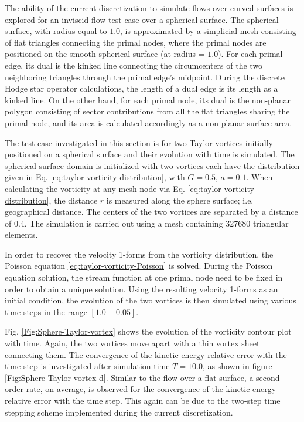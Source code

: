 \documentclass[final,12pt,times]{elsarticle}
\begin{document}
The ability of the current discretization to simulate flows over curved surfaces is explored for an inviscid flow test case over a spherical surface. The spherical surface, with radius equal to $1.0$, is approximated by a simplicial mesh consisting of flat triangles connecting the primal nodes, where the primal nodes are positioned on the smooth spherical surface (at radius = $1.0$). For each primal edge, its dual is the kinked line connecting the circumcenters of the two neighboring triangles through the primal edge's midpoint. During the discrete Hodge star operator calculations, the length of a dual edge is its length as a kinked line. On the other hand, for each primal node, its dual is the non-planar polygon consisting of sector contributions from all the flat triangles sharing the primal node, and its area is calculated accordingly as a non-planar surface area.

The test case investigated in this section is for two Taylor vortices initially positioned on a spherical surface and their evolution with time is simulated. The spherical surface domain is initialized with two vortices each have the distribution given in Eq. \eqref{eq:taylor-vorticity-distribution}, with $G=0.5$, $a=0.1$. When calculating the vorticity at any mesh node via Eq. \eqref{eq:taylor-vorticity-distribution}, the distance $r$ is measured along the sphere surface; i.e. geographical distance. The centers of the two vortices are separated by a distance of $0.4$. The simulation is carried out using a mesh containing 327680 triangular elements.

In order to recover the velocity 1-forms from the vorticity distribution, the Poisson equation \eqref{eq:taylor-vorticity-Poisson} is solved. During the Poisson equation solution, the stream function at one primal node need to be fixed in order to obtain a unique solution. Using the resulting velocity 1-forms as an initial condition, the evolution of the two vortices is then simulated using various time steps in the range $[1.0-0.05]$.

Fig. \ref{Fig:Sphere-Taylor-vortex} shows the evolution of the vorticity contour plot with time. Again, the two vortices move apart with a thin vortex sheet connecting them. The convergence of the kinetic energy relative error with the time step is investigated after simulation time $T=10.0$, as shown in figure \ref{Fig:Sphere-Taylor-vortex-d}. Similar to the flow over a flat surface, a second order rate, on average, is observed for the convergence of the kinetic energy relative error with the time step. This again can be due to the two-step time stepping scheme implemented during the current discretization.     
\end{document}

